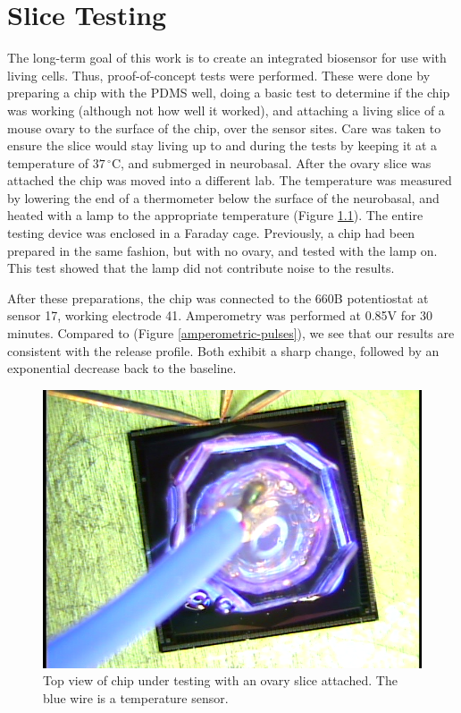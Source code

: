 \chapter{Slice Testing}

The long-term goal of this work is to create an integrated biosensor for use with living cells. Thus, proof-of-concept tests were performed. These were done by preparing a chip with the PDMS well, doing a basic test to determine if the chip was working (although not how well it worked), and attaching a living slice of a mouse ovary to the surface of the chip, over the sensor sites. Care was taken to ensure the slice would stay living up to and during the tests by keeping it at a temperature of $37\,^{\circ}\mathrm{C}$, and submerged in neurobasal. After the ovary slice was attached the chip was moved into a different lab. The temperature was measured by lowering the end of a thermometer below the surface of the neurobasal, and heated with a lamp to the appropriate temperature (Figure \ref{slice-top}). The entire testing device was enclosed in a Faraday cage. Previously, a chip had been prepared in the same fashion, but with no ovary, and tested with the lamp on. This test showed that the lamp did not contribute noise to the results.

After these preparations, the chip was connected to the 660B potentiostat at sensor 17, working electrode 41. Amperometry was performed at 0.85V for 30 minutes. Compared to \cite{mosharok2005aee} (Figure \ref{amperometric-pulses}), we see that our results are consistent with the release profile. Both exhibit a sharp change, followed by an exponential decrease back to the baseline.

\begin{figure}
	\centering
	\includegraphics[width=\linewidth]{figures/slice-top.png}
	\caption[Top view of chip under testing with an ovary slice attached]{Top view of chip under testing with an ovary slice attached. The blue wire is a temperature sensor.}
	\label{slice-top}
\end{figure}

